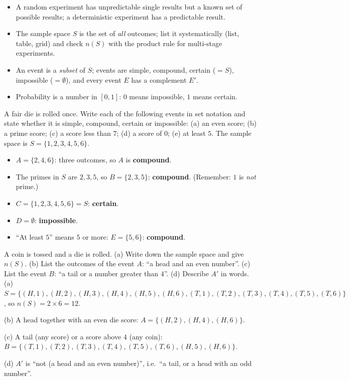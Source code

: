 \documentclass[11pt]{article}
\begin{document}
\begin{aretenir}
\begin{itemize}
\item A random experiment has unpredictable single results but a known set of possible results; a deterministic experiment has a predictable result.
\item The sample space $S$ is the set of \emph{all} outcomes; list it systematically (list, table, grid) and check $n(S)$ with the product rule for multi-stage experiments.
\item An event is a \emph{subset} of $S$; events are simple, compound, certain ($=S$), impossible ($=\emptyset$), and every event $E$ has a complement $E'$.
\item Probability is a number in $[0,1]$: $0$ means impossible, $1$ means certain.
\end{itemize}
\end{aretenir}

\begin{exoresolu}
A fair die is rolled once. Write each of the following events in set notation and state whether it is simple, compound, certain or impossible: (a) an even score; (b) a prime score; (c) a score less than $7$; (d) a score of $0$; (e) at least $5$.
\tcblower
The sample space is $S = \{1,2,3,4,5,6\}$.
\begin{itemize}
\item[(a)] $A = \{2,4,6\}$: three outcomes, so $A$ is \textbf{compound}.
\item[(b)] The primes in $S$ are $2, 3, 5$, so $B = \{2,3,5\}$: \textbf{compound}. (Remember: $1$ is \emph{not} prime.)
\item[(c)] $C = \{1,2,3,4,5,6\} = S$: \textbf{certain}.
\item[(d)] $D = \emptyset$: \textbf{impossible}.
\item[(e)] ``At least $5$'' means $5$ or more: $E = \{5,6\}$: \textbf{compound}.
\end{itemize}
\end{exoresolu}

\begin{exoresolu}
A coin is tossed and a die is rolled. (a) Write down the sample space and give $n(S)$. (b) List the outcomes of the event $A$: ``a head and an even number''. (c) List the event $B$: ``a tail or a number greater than $4$''. (d) Describe $A'$ in words.
\tcblower
(a) $S = \{(H,1),(H,2),(H,3),(H,4),(H,5),(H,6),(T,1),(T,2),(T,3),(T,4),(T,5),(T,6)\}$, so $n(S) = 2 \times 6 = 12$.

(b) A head together with an even die score: $A = \{(H,2),(H,4),(H,6)\}$.

(c) A tail (any score) or a score above $4$ (any coin): $B = \{(T,1),(T,2),(T,3),(T,4),(T,5),(T,6),(H,5),(H,6)\}$.

(d) $A'$ is ``not (a head and an even number)'', i.e.\ ``a tail, or a head with an odd number''.
\end{exoresolu}
\end{document}
